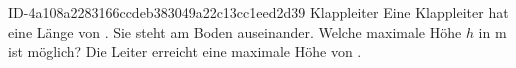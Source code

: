 \begin{exercise}
      {ID-4a108a2283166ccdeb383049a22c13cc1eed2d39}
      {Klappleiter}
  \ifproblem\problem
    Eine Klappleiter hat eine Länge von . Sie steht am Boden
     auseinander. Welche maximale Höhe $h$ in m ist möglich?
  \fi
  \ifoutcome\outcome
    Die Leiter erreicht eine maximale Höhe von .
  \fi
\end{exercise}
